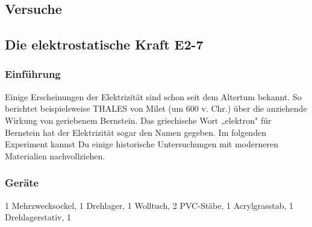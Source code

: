 \documentclass[a4paper]{report}
\begin{document}
\subsection{Versuche} \subsection{Die elektrostatische Kraft E2-7}

\subsubsection{Einführung} Einige Erscheinungen der Elektrizität sind schon
seit dem Altertum bekannt. So berichtet beispielsweise THALES von Milet (um 600
v. Chr.) über die anziehende Wirkung von geriebenem Bernstein. Das griechische
Wort „elektron" für Bernstein hat der Elektrizität sogar den Namen gegeben. Im
folgenden Experiment kannst Du einige historische Untersuchungen mit moderneren
Materialien nachvollziehen. \subsubsection{Geräte} 1 Mehrzwecksockel, 1
Drehlager, 1 Wolltuch, 2 PVC-Stäbe, 1 Acrylgrasstab, 1 Drehlagerstativ, 1
\end{document}
